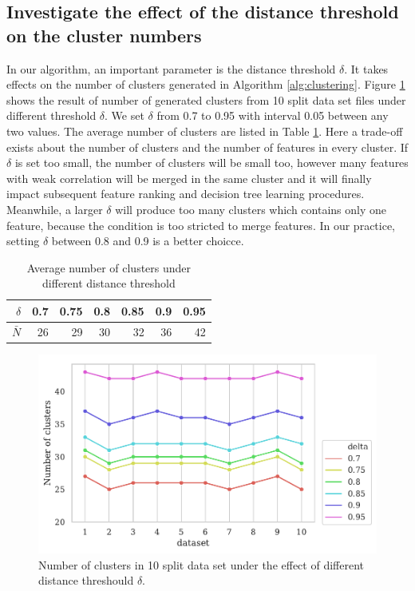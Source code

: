 \documentclass{ieeeaccess}
\theoremstyle{definition}
\begin{document}
\subsection{Investigate the effect of the distance threshold on the cluster numbers}

In our algorithm, an important parameter is the distance threshold $\delta$. It takes effects on the number of clusters generated in Algorithm \ref{alg:clustering}. Figure \ref{fig:different-threshold} shows the result of number of generated clusters from 10 split data set files under different threshold $\delta$. We set $\delta$ from 0.7 to 0.95 with interval 0.05 between any two values. The average number of clusters are listed in Table \ref{tab:mean-cluster-number}. Here a trade-off exists about the number of clusters and the number of features in every cluster. If $\delta$ is set too small, the number of clusters will be small too, however many features with weak correlation will be merged in the same cluster and it will finally impact subsequent feature ranking and decision tree learning procedures. Meanwhile, a larger $\delta$ will produce too many clusters which contains only one feature, because the condition is too stricted to merge features. In our practice, setting $\delta$ between 0.8 and 0.9 is a better choicce.

\begin{table}
    \caption{Average number of clusters under different distance threshold}
    \label{tab:mean-cluster-number}
    \centering
    \begin{tabular}{r|rrrrrr}
        \toprule
        $\delta$ & 0.7 & 0.75 & 0.8 & 0.85 & 0.9 & 0.95 \\
        \midrule
        $\bar{N}$ & 26 & 29 & 30 & 32 & 36 & 42 \\
        \bottomrule
    \end{tabular}
\end{table}

\begin{figure}
    \centering
    \includegraphics[scale=0.5]{fig/Cluster-Number-in-diff-delta.pdf}
    \caption{Number of clusters in 10 split data set under the effect of different distance threshould $\delta$. }
    \label{fig:different-threshold}
\end{figure}
\end{document}
